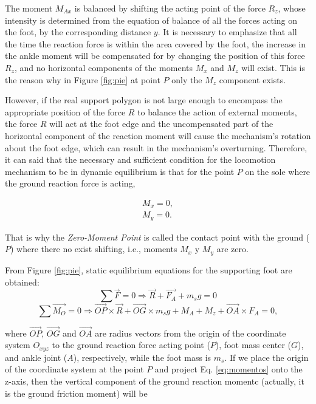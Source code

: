 The moment $M_{Ax}$ is balanced by shifting the acting point of the force $R_z$, whose intensity is determined from the equation of balance of all the forces acting on the foot, by the corresponding distance $y$. It is necessary to emphasize that all the time the reaction force is within the area covered by the foot, the increase in the ankle moment will be compensated for by changing the position of this force $R_z$, and no horizontal components of the moments $M_x$ and $M_z$ will exist. This is the reason why in Figure \ref{fig:pie} at point $P$ only the $M_z$ component exists.

However, if the real support polygon is not large enough to encompass the appropriate position of the force $R$ to balance the action of external moments, the force $R$ will act at the foot edge and the uncompensated part of the horizontal component of the reaction moment will cause the mechanism’s rotation about the foot edge, which can result in the mechanism’s overturning. Therefore, it can said that the necessary and sufficient condition for the locomotion mechanism to be in dynamic equilibrium is that for the point $P$ on the sole where the ground reaction force is acting,

\begin{align}
M_x = 0, \nonumber \\
M_y = 0.
\end{align}

That is why the \textit{Zero-Moment Point} is called the contact point with the ground ($P$) where there no exist shifting, i.e., moments $M_x$ y $M_y$ are zero.

From Figure \ref{fig:pie}, static equilibrium equations for the supporting foot are obtained:
\begin{equation}
\sum \overrightarrow{F} = 0 \Rightarrow \overrightarrow{R} + \overrightarrow{F_A} + m_s g = 0
\label{eq:fuerzas}
\end{equation}
\begin{equation}
\sum \overrightarrow{M_O} = 0 \Rightarrow \overrightarrow{OP} \times \overrightarrow{R} + \overrightarrow{OG} \times m_sg + M_A + M_z + \overrightarrow{OA} \times F_A = 0,
\label{eq:momentos}
\end{equation}

where $\overrightarrow{OP}$, $\overrightarrow{OG}$ and $\overrightarrow{OA}$ are radius vectors from the origin of the coordinate system $O_{xyz}$ to the ground reaction force acting point ($P$), foot mass center ($G$), and ankle joint ($A$), respectively, while the foot mass is $m_s$. If we place the origin of the coordinate system at the point $P$ and project Eq. \eqref{eq:momentos} onto the z-axis, then the vertical component of the ground reaction momentc (actually, it is the ground friction moment) will be

